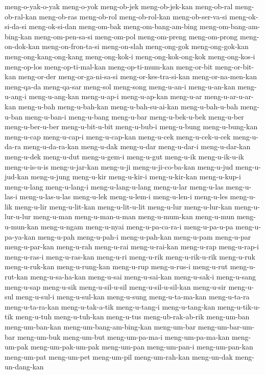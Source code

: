 {meng-o-yak-o-yak meng-o-yok meng-ob-jek meng-ob-jek-kan meng-ob-ral
meng-ob-ral-kan meng-ob-ras meng-ob-rol meng-ob-rol-kan meng-ob-ser-va-si
meng-ok-si-da-si meng-ok-si-dan meng-om-bak meng-om-bang-am-bing
meng-om-bang-am-bing-kan meng-om-pen-sa-si meng-om-pol meng-om-preng
meng-om-prong meng-on-dok-kan meng-on-fron-ta-si meng-on-slah meng-ong-gok
meng-ong-gok-kan meng-ong-kang-ong-kang meng-ong-kok-i
meng-ong-kok-ong-kok meng-ong-kos-i meng-op-los meng-op-ti-mal-kan
meng-op-ti-mum-kan meng-or-bit meng-or-bit-kan meng-or-der
meng-or-ga-ni-sa-si meng-or-kes-tra-si-kan meng-or-na-men-kan meng-qa-da
meng-qa-sar meng-sol meng-song meng-u-an-i meng-u-an-kan meng-u-ang-i
meng-u-ang-kan meng-u-ap-i meng-u-ap-kan meng-u-ar meng-u-ar-u-ar-kan
meng-u-bah meng-u-bah-kan meng-u-bah-su-ai-kan meng-u-bah-u-bah meng-u-ban
meng-u-ban-i meng-u-bang meng-u-bar meng-u-bek-u-bek meng-u-ber
meng-u-ber-u-ber meng-u-bit-u-bit meng-u-bub-i meng-u-bung meng-u-bung-kan
meng-u-cap meng-u-cap-i meng-u-cap-kan meng-u-cek meng-u-cek-u-cek
meng-u-da-ra meng-u-da-ra-kan meng-u-dak meng-u-dar meng-u-dar-i
meng-u-dar-kan meng-u-dek meng-u-dut meng-u-gem-i meng-u-gut meng-u-ik
meng-u-ik-u-ik meng-u-is-u-is meng-u-jar-kan meng-u-ji meng-u-ji-co-ba-kan
meng-u-jud meng-u-jud-kan meng-u-jung meng-u-kir meng-u-kir-i
meng-u-kir-kan meng-u-kup-i meng-u-lang meng-u-lang-i meng-u-lang-u-lang
meng-u-lar meng-u-las meng-u-las-i meng-u-las-u-las meng-u-lek
meng-u-lem-i meng-u-len-i meng-u-les meng-u-lik meng-u-lir meng-u-lit-kan
meng-u-lit-u-lit meng-u-lur meng-u-lur-kan meng-u-lur-u-lur meng-u-man
meng-u-man-u-man meng-u-mum-kan meng-u-mun meng-u-mun-kan meng-u-ngam
meng-u-nyai meng-u-pa-ca-ra-i meng-u-pa-u-pa meng-u-pa-ya-kan meng-u-pah
meng-u-pah-i meng-u-pah-kan meng-u-pam meng-u-par meng-u-par-kan
meng-u-rah meng-u-rai meng-u-rai-kan meng-u-rap meng-u-rap-i meng-u-ras-i
meng-u-ras-kan meng-u-ri meng-u-rik meng-u-rik-u-rik meng-u-ruk
meng-u-ruk-kan meng-u-rung-kan meng-u-rup meng-u-rus-i meng-u-rut
meng-u-rut-kan meng-u-sa-ha-kan meng-u-sai meng-u-sai-kan meng-u-sak-i
meng-u-sang meng-u-sap meng-u-sik meng-u-sil-u-sil meng-u-sil-u-sil-kan
meng-u-sir meng-u-sul meng-u-sul-i meng-u-sul-kan meng-u-sung
meng-u-ta-ma-kan meng-u-ta-ra meng-u-ta-ra-kan meng-u-tak-a-tik
meng-u-tang-i meng-u-tang-kan meng-u-tik-u-tik meng-u-tuh meng-u-tuh-kan
meng-u-tus meng-ub-rak-ab-rik meng-um-ban meng-um-ban-kan
meng-um-bang-am-bing-kan meng-um-bar meng-um-bar-um-bar meng-um-buk
meng-um-but meng-um-pa-ma-i meng-um-pa-ma-kan meng-um-pak
meng-um-pak-um-pak meng-um-pan meng-um-pan-i meng-um-pan-kan meng-um-pat
meng-um-pet meng-um-pil meng-um-rah-kan meng-un-dak meng-un-dang-kan
}
